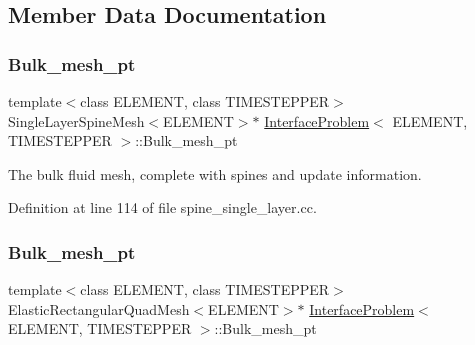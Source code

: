 \subsection{Member Data Documentation}
\mbox{\label{classInterfaceProblem_a3e9ad7667f6f978a1e7c4c55e8e69e6d}} 
\subsubsection{\texorpdfstring{Bulk\+\_\+mesh\+\_\+pt}{Bulk\_mesh\_pt}\hspace{0.1cm}{\footnotesize\ttfamily [1/2]}}
{\footnotesize\ttfamily template$<$class E\+L\+E\+M\+E\+NT, class T\+I\+M\+E\+S\+T\+E\+P\+P\+ER$>$ \\
Single\+Layer\+Spine\+Mesh$<$E\+L\+E\+M\+E\+NT$>$$\ast$ \hyperlink{classInterfaceProblem}{Interface\+Problem}$<$ E\+L\+E\+M\+E\+NT, T\+I\+M\+E\+S\+T\+E\+P\+P\+ER $>$\+::Bulk\+\_\+mesh\+\_\+pt}



The bulk fluid mesh, complete with spines and update information. 



Definition at line 114 of file spine\+\_\+single\+\_\+layer.\+cc.

\mbox{\label{classInterfaceProblem_af580057bd9cc1d05a67401c9e5e178c2}} 
\subsubsection{\texorpdfstring{Bulk\+\_\+mesh\+\_\+pt}{Bulk\_mesh\_pt}\hspace{0.1cm}{\footnotesize\ttfamily [2/2]}}
{\footnotesize\ttfamily template$<$class E\+L\+E\+M\+E\+NT, class T\+I\+M\+E\+S\+T\+E\+P\+P\+ER$>$ \\
Elastic\+Rectangular\+Quad\+Mesh$<$E\+L\+E\+M\+E\+NT$>$$\ast$ \hyperlink{classInterfaceProblem}{Interface\+Problem}$<$ E\+L\+E\+M\+E\+NT, T\+I\+M\+E\+S\+T\+E\+P\+P\+ER $>$\+::Bulk\+\_\+mesh\+\_\+pt\hspace{0.3cm}{\ttfamily [private]}}



